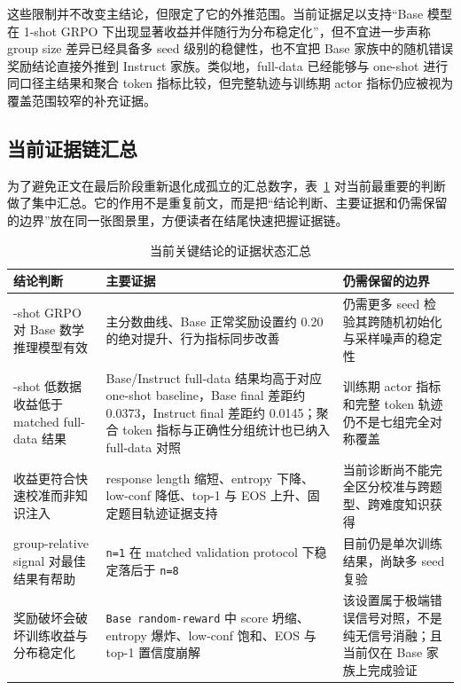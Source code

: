 \documentclass[12pt,a4paper]{ctexart}
\begin{document}
这些限制并不改变主结论，但限定了它的外推范围。当前证据足以支持“Base 模型在 1-shot GRPO 下出现显著收益并伴随行为分布稳定化”，但不宜进一步声称 group size 差异已经具备多 seed 级别的稳健性，也不宜把 Base 家族中的随机错误奖励结论直接外推到 Instruct 家族。类似地，full-data 已经能够与 one-shot 进行同口径主结果和聚合 token 指标比较，但完整轨迹与训练期 actor 指标仍应被视为覆盖范围较窄的补充证据。

\subsection{当前证据链汇总}

为了避免正文在最后阶段重新退化成孤立的汇总数字，表~\ref{tab:evidence-status} 对当前最重要的判断做了集中汇总。它的作用不是重复前文，而是把“结论判断、主要证据和仍需保留的边界”放在同一张图景里，方便读者在结尾快速把握证据链。

\begin{table}[H]
    \centering
    \caption{当前关键结论的证据状态汇总}
    \label{tab:evidence-status}
    \scriptsize
    \setlength{\tabcolsep}{3pt}
    \renewcommand{\arraystretch}{1.2}
    \begin{tabularx}{\textwidth}{>{\raggedright\arraybackslash}p{}>{\raggedright\arraybackslash}p{}>{\raggedright\arraybackslash}X}
        \toprule
        结论判断 & 主要证据 & 仍需保留的边界 \\
        \midrule
        1-shot GRPO 对 Base 数学推理模型有效 & 主分数曲线、Base 正常奖励设置约 0.20 的绝对提升、行为指标同步改善 & 仍需更多 seed 检验其跨随机初始化与采样噪声的稳定性 \\
        1-shot 低数据收益低于 matched full-data 结果 & Base/Instruct full-data 结果均高于对应 one-shot baseline，Base final 差距约 0.0373，Instruct final 差距约 0.0145；聚合 token 指标与正确性分组统计也已纳入 full-data 对照 & 训练期 actor 指标和完整 token 轨迹仍不是七组完全对称覆盖 \\
        收益更符合快速校准而非知识注入 & response length 缩短、entropy 下降、low-conf 降低、top-1 与 EOS 上升、固定题目轨迹证据支持 & 当前诊断尚不能完全区分校准与跨题型、跨难度知识获得 \\
        group-relative signal 对最佳结果有帮助 & \texttt{n=1} 在 matched validation protocol 下稳定落后于 \texttt{n=8} & 目前仍是单次训练结果，尚缺多 seed 复验 \\
        奖励破坏会破坏训练收益与分布稳定化 & \texttt{Base random-reward} 中 score 坍缩、entropy 爆炸、low-conf 饱和、EOS 与 top-1 置信度崩解 & 该设置属于极端错误信号对照，不是纯无信号消融；且当前仅在 Base 家族上完成验证 \\
        \bottomrule
    \end{tabularx}
\end{table}
\end{document}
